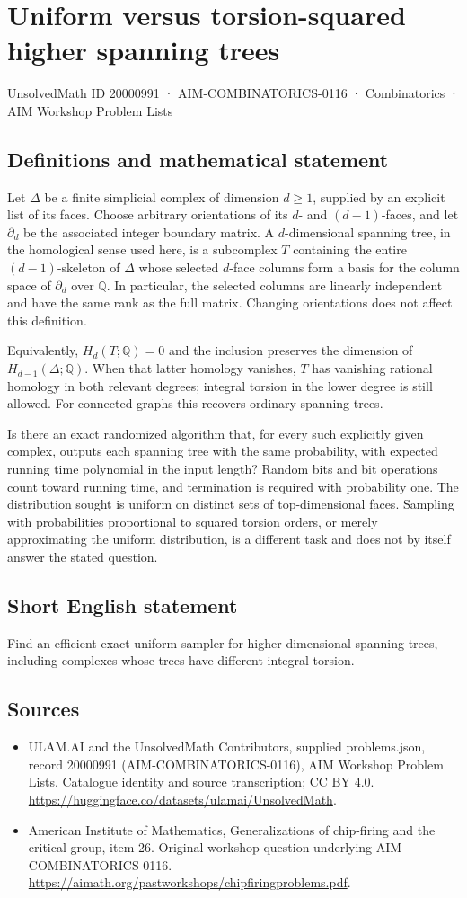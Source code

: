 \documentclass[11pt,a4paper]{article}
\begin{document}
\section*{Uniform versus torsion-squared higher spanning trees}\label{20000991}
{\small UnsolvedMath ID 20000991 · AIM-COMBINATORICS-0116 · Combinatorics · AIM Workshop Problem Lists}
\subsection{Definitions and mathematical statement}
Let $\Delta$ be a finite simplicial complex of dimension $d\geq1$, supplied by an explicit list of its faces.
Choose arbitrary orientations of its $d$- and $(d-1)$-faces, and let $\partial_d$ be the associated integer boundary matrix.
A $d$-dimensional spanning tree, in the homological sense used here, is a subcomplex $T$ containing the entire $(d-1)$-skeleton of $\Delta$ whose selected $d$-face columns form a basis for the column space of $\partial_d$ over $\mathbb Q$.
In particular, the selected columns are linearly independent and have the same rank as the full matrix.
Changing orientations does not affect this definition.

Equivalently, $H_d(T;\mathbb Q)=0$ and the inclusion preserves the dimension of $H_{d-1}(\Delta;\mathbb Q)$.
When that latter homology vanishes, $T$ has vanishing rational homology in both relevant degrees; integral torsion in the lower degree is still allowed.
For connected graphs this recovers ordinary spanning trees.

Is there an exact randomized algorithm that, for every such explicitly given complex, outputs each spanning tree with the same probability, with expected running time polynomial in the input length?
Random bits and bit operations count toward running time, and termination is required with probability one.
The distribution sought is uniform on distinct sets of top-dimensional faces.
Sampling with probabilities proportional to squared torsion orders, or merely approximating the uniform distribution, is a different task and does not by itself answer the stated question.
\subsection{Short English statement}
Find an efficient exact uniform sampler for higher-dimensional spanning trees, including complexes whose trees have different integral torsion.
\subsection{Sources}
\begin{itemize}
\item[S1] ULAM.AI and the UnsolvedMath Contributors, supplied problems.json, record 20000991 (AIM-COMBINATORICS-0116), AIM Workshop Problem Lists. Catalogue identity and source transcription; CC BY 4.0.
\url{https://huggingface.co/datasets/ulamai/UnsolvedMath}.
\item[S2] American Institute of Mathematics, Generalizations of chip-firing and the critical group, item 26. Original workshop question underlying AIM-COMBINATORICS-0116.
\url{https://aimath.org/pastworkshops/chipfiringproblems.pdf}.
\end{itemize}
\end{document}
